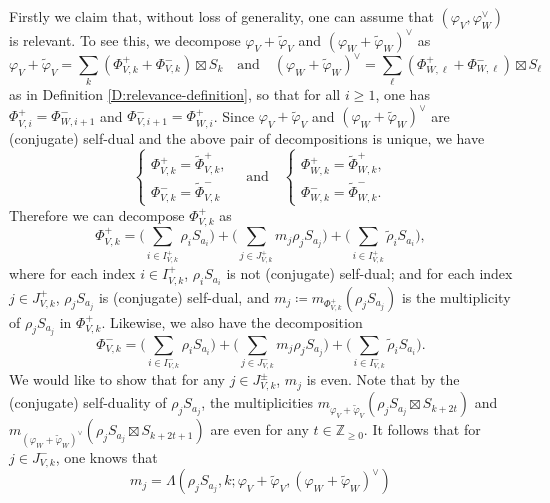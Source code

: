 \documentclass[11pt,letterpaper]{amsart}
\theoremstyle{plain}
\numberwithin{theorem}{section}
\numberwithin{equation}{subsection}
\theoremstyle{remark}
\newcommand{\Z}{\mathbb{Z}}
\begin{document}
Firstly we claim that, without loss of generality, one can assume that $\left(\varphi_V,\varphi_W^\vee\right)$ is relevant. To see this, we decompose $\varphi_V + \widetilde{\varphi}_V$ and $\left(\varphi_W + \widetilde{\varphi}_W\right)^\vee$ as
\[
    \varphi_V + \widetilde{\varphi}_V = \sum_{k} \left(\Phi_{V,k}^+ + \Phi_{V,k}^-\right) \boxtimes S_k \quad \text{and} \quad \left(\varphi_W + \widetilde{\varphi}_W\right)^\vee = \sum_{\ell} \left(\Phi_{W,\ell}^+ + \Phi_{W,\ell}^-\right) \boxtimes S_\ell
\]
as in Definition \ref{D:relevance-definition}, so that for all $i\geq 1$, one has $\Phi_{V,i}^+ = \Phi_{W,i+1}^-$ and $\Phi_{V,i+1}^- = \Phi_{W,i}^+$. Since $\varphi_V + \widetilde{\varphi}_V$ and $\left(\varphi_W + \widetilde{\varphi}_W\right)^\vee$ are (conjugate) self-dual and the above pair of decompositions is unique, we have
\[
    \begin{cases}
    \Phi_{V,k}^+ = \widetilde{\Phi}_{V,k}^+,\\ 
     \Phi_{V,k}^- = \widetilde{\Phi}_{V,k}^-   
    \end{cases}
    \quad \text{and} \quad
        \begin{cases}
    \Phi_{W,k}^+ = \widetilde{\Phi}_{W,k}^+,\\ 
     \Phi_{W,k}^- = \widetilde{\Phi}_{W,k}^-.   
    \end{cases}
\]
Therefore we can decompose $\Phi_{V,k}^+$ as
\[
    \Phi_{V,k}^+ = \Big(\sum_{i\in I_{V,k}^+} \rho_i S_{a_i}\Big) + \Big(\sum_{j\in J_{V,k}^+} m_j\rho_j S_{a_j}\Big) + \Big(\sum_{i\in I_{V,k}^+} \widetilde{\rho}_i S_{a_i}\Big),
\]
where for each index $i\in I_{V,k}^+$, $\rho_i S_{a_i}$ is not (conjugate) self-dual; and for each index $j\in J_{V,k}^+$, $\rho_j S_{a_j}$ is (conjugate) self-dual, and $m_j \coloneqq m_{\Phi_{V,k}^+}\left(\rho_j S_{a_j}\right)$ is the multiplicity of $\rho_j S_{a_j}$ in $\Phi_{V,k}^+$. Likewise, we also have the decomposition
\[
    \Phi_{V,k}^- = \Big(\sum_{i\in I_{V,k}^-} \rho_i S_{a_i}\Big) + \Big(\sum_{j\in J_{V,k}^-} m_j\rho_j S_{a_j}\Big) + \Big(\sum_{i\in I_{V,k}^-} \widetilde{\rho}_i S_{a_i}\Big).
\]
We would like to show that for any $j\in J_{V,k}^\pm$, $m_j$ is even. Note that by the (conjugate) self-duality of $\rho_j S_{a_j}$, the multiplicities $m_{\varphi_V + \widetilde{\varphi}_V}\left(\rho_j S_{a_j}\boxtimes S_{k+2t}\right)$ and $m_{(\varphi_W + \widetilde{\varphi}_W)^\vee}\left(\rho_j S_{a_j}\boxtimes S_{k+2t+1}\right)$ are even for any $t\in\Z_{\geq 0}$. It follows that for $j\in J_{V,k}^-$, one knows that
\[
    m_j = \Lambda\left(\rho_j S_{a_j},k; \varphi_V + \widetilde{\varphi}_V,\left(\varphi_W + \widetilde{\varphi}_W\right)^\vee\right)
\]
\end{document}
